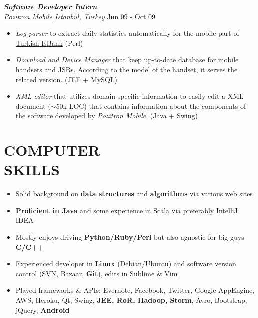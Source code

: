 \documentclass[line, margin]{res}
\begin{document}
\begin{resume}
	{\sl \textbf{Software Developer Intern} \\ \href{http://www.pozitron.com/}{Pozitron Mobile} Istanbul, Turkey} \hfill Jun 09 - Oct 09\\
	\vspace{-0.3cm}
	\begin{itemize} \itemsep -2pt
		\item \textit{Log parser} to extract daily statistics automatically for the mobile part of \href{http://www.isbank.com.tr/English/}{Turkish IsBank} (Perl)
		\item \textit{Download and Device Manager} that keep up-to-date database for mobile handsets  and JSRs. According to the model of the handset, it serves the related version. (JEE + MySQL)
		\item \textit{XML editor} that utilizes domain specific information to easily edit a XML document ($\sim$50k LOC) that contains information about the components of the software developed by \textit{Pozitron Mobile}. (Java + Swing)
	\end{itemize}

\section{COMPUTER \\ SKILLS} 
	\begin{itemize}
		\item Solid background on \textbf{data structures} and \textbf{algorithms} via various web sites
		\item \textbf{Proficient in Java} and some experience in Scala via preferably IntelliJ IDEA
		\item Mostly enjoys driving \textbf{Python/Ruby/Perl} but also agnostic for big guys \textbf{C/C++}
		\item Experienced developer in \textbf{Linux} (Debian/Ubuntu) and software version control (SVN, Bazaar, \textbf{Git}), edits in Sublime \& Vim
		\item Played frameworks \& APIs: Evernote, Facebook, Twitter, Google AppEngine, AWS, Heroku, Qt, Swing,  \textbf{JEE, RoR, Hadoop, Storm}, Avro, Bootstrap, jQuery, \textbf{Android}
	\end{itemize}
\end{resume}
\end{document}
